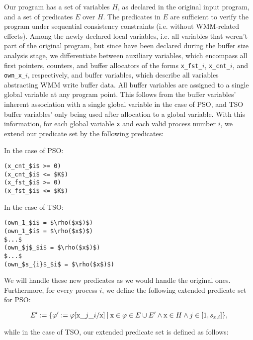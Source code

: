 Our program has a set of variables $H$, as declared in the original input program, and a set of predicates $E$ over $H$. The predicates in $E$ are sufficient to verify the program under sequential consistency constraints (i.e. without WMM-related effects). Among the newly declared local variables, i.e. all variables that weren't part of the original program, but since have been declared during the buffer size analysis stage, we differentiate between auxiliary variables, which encompass all first pointers, counters, and buffer allocators of the forms \lstinline$x_fst_$$i$, \lstinline$x_cnt_$$i$, and \lstinline$own_x_$$i$, respectively, and buffer variables, which describe all variables abstracting WMM write buffer data. All buffer variables are assigned to a single global variable at any program point. This follows from the buffer variables' inherent association with a single global variable in the case of PSO, and TSO buffer variables' only being used after allocation to a global variable. With this information, for each global variable \lstinline$x$ and each valid process number $i$, we extend our predicate set by the following predicates:

\begin{multicols}{2}

In the case of PSO:

\begin{lstlisting}[frame=single, mathescape]
(x_cnt_$i$ >= 0)
(x_cnt_$i$ <= $K$)
(x_fst_$i$ >= 0)
(x_fst_$i$ <= $K$)
\end{lstlisting}

\columnbreak

In the case of TSO:

\begin{lstlisting}[frame=single, mathescape]
(own_1_$i$ = $\rho($x$)$)
(own_1_$i$ = $\rho($x$)$)
$...$
(own_$j$_$i$ = $\rho($x$)$)
$...$
(own_$s_{i}$_$i$ = $\rho($x$)$)
\end{lstlisting}

\end{multicols}

We will handle these new predicates as we would handle the original ones. Furthermore, for every process $i$, we define the following extended predicate set for PSO:

\[E':=\{\varphi' := \varphi[\lstinline$x_$j\lstinline$_$i / \lstinline$x$] \: | \: \lstinline$x$ \in \varphi \in E \cup E' \wedge \lstinline$x$ \in H \wedge j \in [1, s_{x,i}]\},\]

while in the case of TSO, our extended predicate set is defined as follows:

